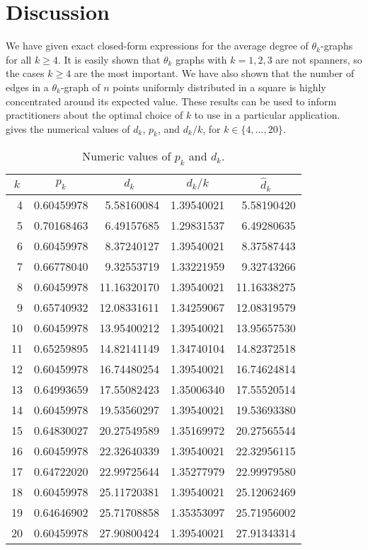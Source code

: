 \documentclass[twoside,leqno,twocolumn]{article}
\begin{document}
\section{Discussion}

We have given exact closed-form expressions for the average degree of
$\theta_k$-graphs for all $k\ge 4$.  It is easily shown that $\theta_k$
graphs with $k=1,2,3$ are not spanners, so the cases $k\ge 4$ are
the most important.  We have also shown that the number of edges in
a $\theta_k$-graph of $n$ points uniformly distributed in a square is
highly concentrated around its expected value.  These results can be
used to inform practitioners about the optimal choice of $k$ to use in
a particular application.   gives the numerical values
of $d_k$, $p_k$, and $d_k/k$, for $k\in\{4,\ldots,20\}$.

\begin{table*}
   \begin{center}
     \begin{tabular}{r|r|r|r|r|}
       \multicolumn{1}{c|}{$k$} & \multicolumn{1}{c|}{$p_k$} & \multicolumn{1}{c|}{$d_k$} & \multicolumn{1}{c|}{$d_k/k$} & \multicolumn{1}{c|}{$\hat{d}_k$} \\ \hline
         4 & 0.60459978 &  5.58160084 & 1.39540021 &  5.58190420  \\
         5 & 0.70168463 &  6.49157685 & 1.29831537 &  6.49280635  \\
         6 & 0.60459978 &  8.37240127 & 1.39540021 &  8.37587443  \\
         7 & 0.66778040 &  9.32553719 & 1.33221959 &  9.32743266  \\
         8 & 0.60459978 & 11.16320170 & 1.39540021 & 11.16338275  \\
         9 & 0.65740932 & 12.08331611 & 1.34259067 & 12.08319579  \\
        10 & 0.60459978 & 13.95400212 & 1.39540021 & 13.95657530  \\
        11 & 0.65259895 & 14.82141149 & 1.34740104 & 14.82372518  \\
        12 & 0.60459978 & 16.74480254 & 1.39540021 & 16.74624814  \\
        13 & 0.64993659 & 17.55082423 & 1.35006340 & 17.55520514  \\
        14 & 0.60459978 & 19.53560297 & 1.39540021 & 19.53693380  \\
        15 & 0.64830027 & 20.27549589 & 1.35169972 & 20.27565544  \\
        16 & 0.60459978 & 22.32640339 & 1.39540021 & 22.32956115  \\
        17 & 0.64722020 & 22.99725644 & 1.35277979 & 22.99979580  \\
        18 & 0.60459978 & 25.11720381 & 1.39540021 & 25.12062469  \\
        19 & 0.64646902 & 25.71708858 & 1.35353097 & 25.71956002  \\
        20 & 0.60459978 & 27.90800424 & 1.39540021 & 27.91343314  
     \end{tabular}
   \end{center}
   \caption{Numeric values of $p_k$ and $d_k$.}
\end{table*}
\end{document}
